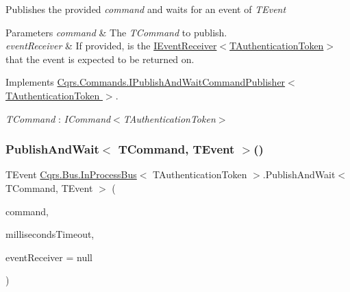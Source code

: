 Publishes the provided {\itshape command}  and waits for an event of {\itshape T\+Event}  


\begin{DoxyParams}{Parameters}
{\em command} & The {\itshape T\+Command}  to publish.\\
\hline
{\em event\+Receiver} & If provided, is the \hyperlink{interfaceCqrs_1_1Events_1_1IEventReceiver}{I\+Event\+Receiver$<$\+T\+Authentication\+Token$>$} that the event is expected to be returned on.\\
\hline
\end{DoxyParams}


Implements \hyperlink{interfaceCqrs_1_1Commands_1_1IPublishAndWaitCommandPublisher_a19ffb318c830e9f05d4adae985232f30_a19ffb318c830e9f05d4adae985232f30}{Cqrs.\+Commands.\+I\+Publish\+And\+Wait\+Command\+Publisher$<$ T\+Authentication\+Token $>$}.

\begin{Desc}
\item[Type Constraints]\begin{description}
\item[{\em T\+Command} : {\em I\+Command$<$T\+Authentication\+Token$>$}]\end{description}
\end{Desc}
\mbox{\label{classCqrs_1_1Bus_1_1InProcessBus_a977e49340f771248ddf485eeee650e04_a977e49340f771248ddf485eeee650e04}} 
\subsubsection{\texorpdfstring{Publish\+And\+Wait$<$ T\+Command, T\+Event $>$()}{PublishAndWait< TCommand, TEvent >()}\hspace{0.1cm}{\footnotesize\ttfamily [2/6]}}
{\footnotesize\ttfamily T\+Event \hyperlink{classCqrs_1_1Bus_1_1InProcessBus}{Cqrs.\+Bus.\+In\+Process\+Bus}$<$ T\+Authentication\+Token $>$.Publish\+And\+Wait$<$ T\+Command, T\+Event $>$ (\begin{DoxyParamCaption}\item[{T\+Command}]{command,  }\item[{int}]{milliseconds\+Timeout,  }\item[{\hyperlink{interfaceCqrs_1_1Events_1_1IEventReceiver}{I\+Event\+Receiver}$<$ T\+Authentication\+Token $>$}]{event\+Receiver = {\ttfamily null} }\end{DoxyParamCaption})}



